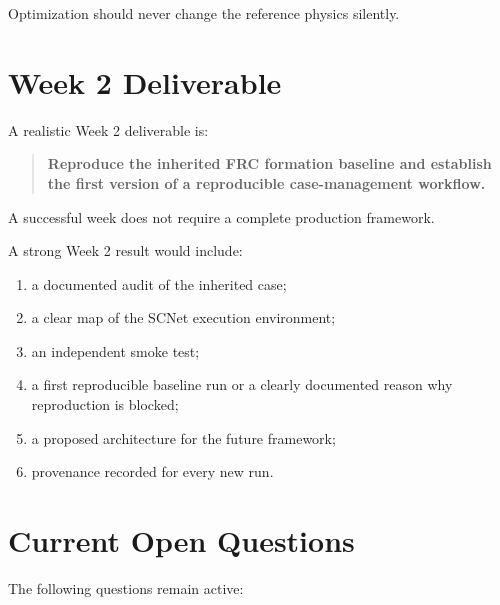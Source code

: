 \documentclass[11pt,a4paper]{article}
\begin{document}
Optimization should never change the reference physics silently.

\section{Week 2 Deliverable}

A realistic Week 2 deliverable is:

\begin{quote}
\textbf{Reproduce the inherited FRC formation baseline and establish the first version of a reproducible case-management workflow.}
\end{quote}

A successful week does not require a complete production framework.

A strong Week 2 result would include:

\begin{enumerate}[label=\arabic*.]
    \item a documented audit of the inherited case;
    \item a clear map of the SCNet execution environment;
    \item an independent smoke test;
    \item a first reproducible baseline run or a clearly documented reason why reproduction is blocked;
    \item a proposed architecture for the future framework;
    \item provenance recorded for every new run.
\end{enumerate}

\section{Current Open Questions}

The following questions remain active:
\end{document}
